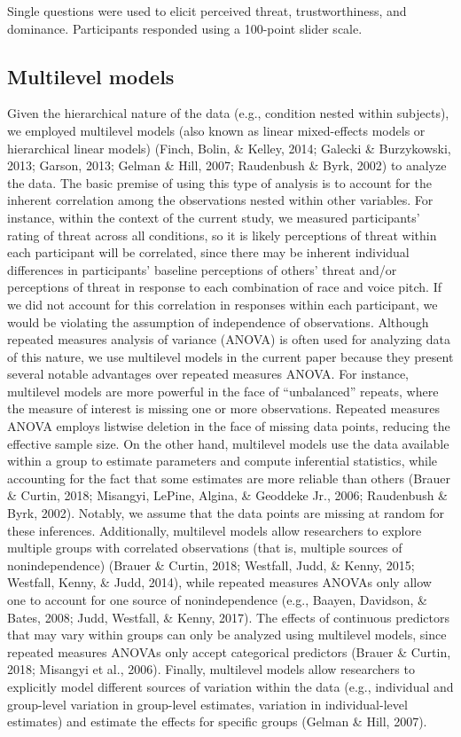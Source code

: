 \documentclass[
  english,
  man, noextraspace,floatsintext]{apa6}
\begin{document}
Single questions were used to elicit perceived threat, trustworthiness, and dominance. Participants responded using a 100-point slider scale.

\hypertarget{multilevel-models}{%
\subsection{Multilevel models}\label{multilevel-models}}

Given the hierarchical nature of the data (e.g., condition nested within subjects), we employed multilevel models (also known as linear mixed-effects models or hierarchical linear models) (Finch, Bolin, \& Kelley, 2014; Galecki \& Burzykowski, 2013; Garson, 2013; Gelman \& Hill, 2007; Raudenbush \& Byrk, 2002) to analyze the data. The basic premise of using this type of analysis is to account for the inherent correlation among the observations nested within other variables. For instance, within the context of the current study, we measured participants' rating of threat across all conditions, so it is likely perceptions of threat within each participant will be correlated, since there may be inherent individual differences in participants' baseline perceptions of others' threat and/or perceptions of threat in response to each combination of race and voice pitch. If we did not account for this correlation in responses within each participant, we would be violating the assumption of independence of observations. Although repeated measures analysis of variance (ANOVA) is often used for analyzing data of this nature, we use multilevel models in the current paper because they present several notable advantages over repeated measures ANOVA. For instance, multilevel models are more powerful in the face of ``unbalanced'' repeats, where the measure of interest is missing one or more observations. Repeated measures ANOVA employs listwise deletion in the face of missing data points, reducing the effective sample size. On the other hand, multilevel models use the data available within a group to estimate parameters and compute inferential statistics, while accounting for the fact that some estimates are more reliable than others (Brauer \& Curtin, 2018; Misangyi, LePine, Algina, \& Geoddeke Jr., 2006; Raudenbush \& Byrk, 2002). Notably, we assume that the data points are missing at random for these inferences. Additionally, multilevel models allow researchers to explore multiple groups with correlated observations (that is, multiple sources of nonindependence) (Brauer \& Curtin, 2018; Westfall, Judd, \& Kenny, 2015; Westfall, Kenny, \& Judd, 2014), while repeated measures ANOVAs only allow one to account for one source of nonindependence (e.g., Baayen, Davidson, \& Bates, 2008; Judd, Westfall, \& Kenny, 2017). The effects of continuous predictors that may vary within groups can only be analyzed using multilevel models, since repeated measures ANOVAs only accept categorical predictors (Brauer \& Curtin, 2018; Misangyi et al., 2006). Finally, multilevel models allow researchers to explicitly model different sources of variation within the data (e.g., individual and group-level variation in group-level estimates, variation in individual-level estimates) and estimate the effects for specific groups (Gelman \& Hill, 2007).
\end{document}
